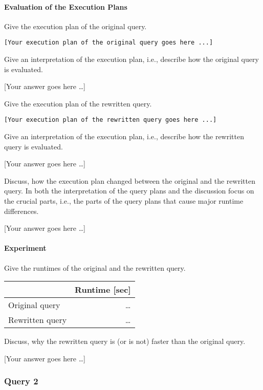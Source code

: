 \documentclass[11pt]{scrartcl}
\newcommand{\youranswerhere}{[Your answer goes here \ldots]}
\begin{document}
\paragraph{Evaluation of the Execution Plans}

Give the execution plan of the original query.

{\small
\parskip0pt\begin{verbatim}
[Your execution plan of the original query goes here ...]
\end{verbatim}}

Give an interpretation of the execution plan, i.e., describe how the original query is evaluated.

\youranswerhere{}

Give the execution plan of the rewritten query.

{\small
\parskip0pt\begin{verbatim}
[Your execution plan of the rewritten query goes here ...]
\end{verbatim}}

Give an interpretation of the execution plan, i.e., describe how the rewritten query is evaluated.

\youranswerhere{}

Discuss, how the execution plan changed between the original and the rewritten query. In both the interpretation of the query plans and the discussion focus on the crucial parts, i.e., the parts of the query plans that cause major runtime differences.

\youranswerhere{}

\paragraph{Experiment}

Give the runtimes of the original and the rewritten query.

\begin{table}[H]
  \centering
  \begin{tabular}{l|r}
    & Runtime [sec] \tabularnewline
    \hline
    Original query & \ldots \tabularnewline
    Rewritten query & \ldots \tabularnewline
  \end{tabular}
\end{table}

Discuss, why the rewritten query is (or is not) faster than the original query.

\youranswerhere{}

\subsubsection*{Query 2}
\end{document}
